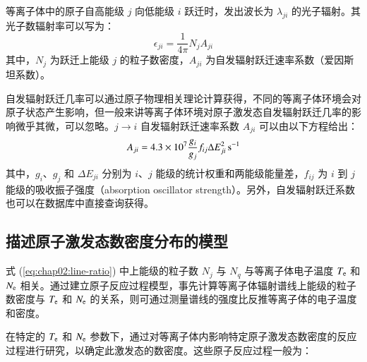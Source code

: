 等离子体中的原子自高能级 $j$ 向低能级 $i$ 跃迁时，发出波长为 $\lambda_{ji}$ 的光子辐射。其光子数辐射率可以写为\cite{Wiese1966:book}：
\begin{equation}
  \epsilon_{ji}=\frac{1}{4\pi}N_{j}A_{ji}
\end{equation}
其中，$N_j$ 为跃迁上能级 $j$ 的粒子数密度，$A_{ji}$ 为自发辐射跃迁速率系数（爱因斯坦系数）。

自发辐射跃迁几率可以通过原子物理相关理论计算获得，不同的等离子体环境会对原子状态产生影响，但一般来讲等离子体环境对原子激发态自发辐射跃迁几率的影响微乎其微，可以忽略。$j\to i$ 自发辐射跃迁速率系数 $A_{ji}$ 可以由以下方程给出\cite{Kolb1964:A-formular}：
\begin{equation}
  A_{ji}=4.3\times10^7\frac{g_i}{g_j}f_{ij}\Delta E_{ji}^2\,{\rm s}^{-1}
\end{equation}
其中，$g_i$、$g_j$ 和 $\Delta E_{ji}$ 分别为 $i$、$j$ 能级的统计权重和两能级能量差，$f_{ij}$ 为 $i$ 到 $j$ 能级的吸收振子强度（absorption oscillator strength）\cite{Johnson1972:collisionalstrength}。另外，自发辐射跃迁系数也可以在数据库\cite{NISTdatabase}中直接查询获得。

\subsection{描述原子激发态数密度分布的模型}

式 (\ref{eq:chap02:line-ratio}) 中上能级的粒子数 $N_j$ 与 $N_q$ 与等离子体电子温度 $T_{\rm e}$ 和 $N_{\rm e}$ 相关。通过建立原子反应过程模型，事先计算等离子体辐射谱线上能级的粒子数密度与 $T_{\rm e}$ 和 $N_{\rm e}$ 的关系，则可通过测量谱线的强度比反推等离子体的电子温度和密度。

在特定的 $T_{\rm e}$ 和 $N_{\rm e}$ 参数下，通过对等离子体内影响特定原子激发态数密度的反应过程进行研究，以确定此激发态的数密度。这些原子反应过程一般为\cite{atomicprocesses,YuChangxuan:book}：

